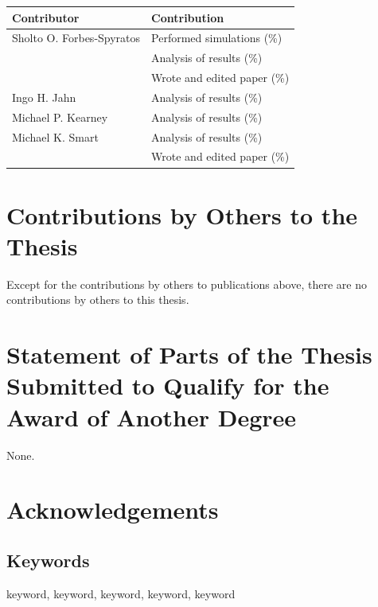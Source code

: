 \begin{center}
  \begin{tabular}{ll}
    \toprule
    Contributor   & Contribution \\
    \midrule
    Sholto O. Forbes-Spyratos             
                                  & Performed simulations (\%)\\
                                  & Analysis of results (\%)\\
                                  & Wrote and edited paper (\%)\\
    \midrule
    Ingo H. Jahn            
                                  & Analysis of results (\%)\\
                                  
        \midrule
        Michael P. Kearney            
								      & Analysis of results (\%)\\                          

    \midrule
    Michael K. Smart              
                                  & Analysis of results (\%)\\
                                  & Wrote and edited paper (\%)\\
    \bottomrule
  \end{tabular}
\end{center}



\section*{Contributions by Others to the Thesis}

Except for the contributions by others to publications above, there are no contributions by others to this thesis.

\section*{Statement of Parts of the Thesis Submitted to Qualify for the Award of Another Degree}

None.

\clearpage

\section*{Acknowledgements} 
  

  \vfill


\clearpage
\subsection*{Keywords}
  keyword, keyword, keyword, keyword, keyword

